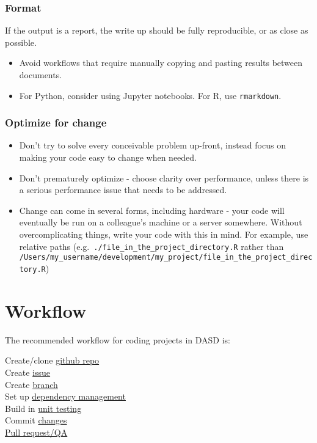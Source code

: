 \documentclass[]{book}
\providecommand{\tightlist}{%
  \setlength{\itemsep}{0pt}\setlength{\parskip}{0pt}}
\begin{document}
\hypertarget{format}{%
\subsection{Format}\label{format}}

If the output is a report, the write up should be fully reproducible, or as close as possible.

\begin{itemize}
\tightlist
\item
  Avoid workflows that require manually copying and pasting results between documents.\\
\item
  For Python, consider using Jupyter notebooks. For R, use \texttt{rmarkdown}.
\end{itemize}

\hypertarget{change}{%
\subsection{Optimize for change}\label{change}}

\begin{itemize}
\tightlist
\item
  Don't try to solve every conceivable problem up-front, instead focus on making your code easy to change when needed.
\item
  Don't prematurely optimize - choose clarity over performance, unless there is a serious performance issue that needs to be addressed.
\item
  Change can come in several forms, including hardware - your code will eventually be run on a colleague's machine or a server somewhere. Without overcomplicating things, write your code with this in mind. For example, use relative paths (e.g.~\texttt{./file\_in\_the\_project\_directory.R} rather than \texttt{/Users/my\_username/development/my\_project/file\_in\_the\_project\_directory.R})
\end{itemize}

\hypertarget{wf}{%
\chapter{Workflow}\label{wf}}

The recommended workflow for coding projects in DASD is:

Create/clone \protect\hyperlink{versioncontrol}{github repo}\\
Create \protect\hyperlink{versioncontrol}{issue}\\
Create \protect\hyperlink{versioncontrol}{branch}\\
Set up \protect\hyperlink{projdep}{dependency management}\\
Build in \protect\hyperlink{unittest}{unit testing}\\
Commit \protect\hyperlink{versioncontrol}{changes}\\
\protect\hyperlink{review}{Pull request/QA}
\end{document}
